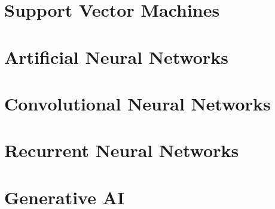 \documentclass[
]{book}
\begin{document}
\hypertarget{svm}{%
\chapter{Support Vector Machines}\label{svm}}

\hypertarget{ann}{%
\chapter{Artificial Neural Networks}\label{ann}}

\hypertarget{cnn}{%
\chapter{Convolutional Neural Networks}\label{cnn}}

\hypertarget{rnn}{%
\chapter{Recurrent Neural Networks}\label{rnn}}

\hypertarget{gen-AI}{%
\chapter{Generative AI}\label{gen-AI}}

  
\end{document}
